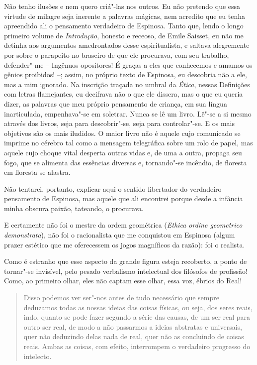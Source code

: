 Não tenho ilusões e nem quero criá"-las nos outros. Eu não pretendo que
essa virtude de milagre seja inerente a palavras mágicas, nem acredito
que eu tenha apreendido ali o pensamento verdadeiro de Espinosa. Tanto
que, lendo o longo primeiro volume de \emph{Introdução}, honesto e
receoso, de Emile Saisset, eu não me detinha aos argumentos amedrontados
desse espiritualista, e saltava alegremente por sobre o parapeito no
braseiro de que ele procurava, com seu trabalho, defender"-me -- Ingênuos
opositores! É graças a eles que conhecemos e amamos os gênios proibidos!
--; assim, no próprio texto de Espinosa, eu descobria não a ele, mas a
mim ignorado. Na inscrição traçada no umbral da \emph{Ética}, nessas
Definições com letras flamejantes, eu decifrava não o que ele dissera,
mas o que eu queria dizer, as palavras que meu próprio pensamento de
criança, em sua língua inarticulada, empenhava"-se em soletrar. Nunca se
lê um livro. Lê"-se a si mesmo através dos livros, seja para
descobrir"-se, seja para controlar"-se. E os mais objetivos são os mais
iludidos. O maior livro não é aquele cujo comunicado se imprime no
cérebro tal como a mensagem telegráfica sobre um rolo de papel, mas
aquele cujo choque vital desperta outras vidas e, de uma a outra,
propaga seu fogo, que se alimenta das essências diversas e, tornando"-se
incêndio, de floresta em floresta se alastra.

Não tentarei, portanto, explicar aqui o sentido libertador do verdadeiro
pensamento de Espinosa, mas aquele que ali encontrei porque desde a
infância minha obscura paixão, tateando, o procurava.

E certamente não foi o mestre da ordem geométrica (\emph{Ethica ordine
geometrico demonstrata}), não foi o racionalista que me conquistou em
Espinosa (algum prazer estético que me oferecessem os jogos magníficos
da razão): foi o realista.

Como é estranho que esse aspecto da grande figura esteja recoberto, a
ponto de tornar"-se invisível, pelo pesado verbalismo intelectual dos
filósofos de profissão! Como, ao primeiro olhar, eles não captam esse
olhar, essa voz, ébrios do Real!

\begin{quote}
Disso podemos ver ser"-nos antes de tudo necessário que sempre deduzamos
todas as nossas ideias das coisas físicas, ou seja, dos seres reais,
indo, quanto se pode fazer segundo a série das causas, de um ser real
para outro ser real, de modo a não passarmos a ideias abstratas e
universais, quer não deduzindo delas nada de real, quer não as
concluindo de coisas reais. Ambas as coisas, com efeito, interrompem o
verdadeiro progresso do intelecto.
\end{quote}

